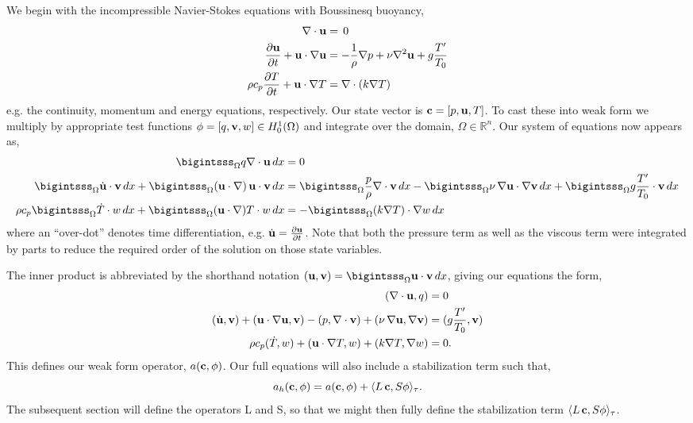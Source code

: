 We begin with the incompressible Navier-Stokes equations with Boussinesq
buoyancy,
\begin{align}
 \nabla \cdot {\bf u} &= \, 0 \label{eq_cont}\\
 \frac{\partial {\bf u}}{\partial t} + {\bf u} \cdot \nabla {\bf u} &= -\frac{1}{\rho}
 \nabla p + \nu \nabla^2 {\bf u} + g \frac{T'}{T_0} \label{eq_mom}\\
 \rho c_p \frac{\partial T}{\partial t} + {\bf u} \cdot \nabla T &= \nabla
 \cdot (k \nabla T) \label{eq_energy}
\end{align}
e.g. the continuity, momentum and energy equations, respectively. Our 
state vector is ${\bf c} =  \left[p,{\bf u},T \right]$. To cast these into
weak form we multiply by appropriate test 
functions ${\bf \phi} = \left[q,{\bf v},w \right] \in H^1_0(\Omega)$ and
integrate over the domain, $\Omega \in \mathbb{R}^n$. Our system of
equations now appears as, 
\begin{align}
  \bigintsss_\Omega q \nabla \cdot {\bf u} \, dx &= 0 \\
 \bigintsss_\Omega \dot {\bf u} \cdot {\bf v} \, dx +
 \bigintsss_\Omega  ({\bf u} \cdot \nabla) \, {\bf u} \cdot {\bf v} \, dx &=
 \bigintsss_\Omega \frac{p}{\rho} \nabla \cdot {\bf v} \, dx -
 \bigintsss_\Omega \nu \, \nabla {\bf u} \cdot \nabla {\bf v}
 \,dx + \bigintsss_\Omega g \frac{T'}{T_0} \cdot {\bf v} \, dx \\ 
 \rho c_p \bigintsss_\Omega \dot T \cdot w \, dx + \bigintsss_\Omega ({\bf u}
 \cdot \nabla) T \cdot w \, dx  &= -\bigintsss_\Omega (k \nabla T) \cdot
 \nabla w \, dx
\end{align}
%
where an ``over-dot'' denotes time differentiation, e.g. $\dot {\bf u} =
\frac{\partial {\bf u}}{\partial t}$. Note that both the pressure term as well
as the viscous term were integrated by parts to reduce the required
order of the solution on those state variables.  

The inner product is abbreviated by the shorthand notation $({\bf u},{\bf v}) =
\bigintsss_\Omega {\bf u}\cdot {\bf v}\, dx $, giving our equations the form,  
\begin{align}
 (\nabla \cdot {\bf u}, q) &= 0 \\
 (\dot {\bf u},{\bf v}) + ({\bf u} \cdot \nabla {\bf u}, {\bf v}) -
 (p,\nabla \cdot {\bf v}) + (\nu \, \nabla
 {\bf u}, \nabla {\bf v}) &= (g \frac{T'}{T_0},{\bf v}) \\
 \rho c_p (\dot T,w) + ({\bf u} \cdot \nabla T,w) + (k \nabla T,\nabla w) &= 0.
\end{align}
%
This defines our weak form operator, $ a({\bf c},{\bf \phi})$. Our full equations will
also include a stabilization term such that,  
\begin{equation}
 a_h({\bf c},{\bf \phi}) = a({\bf c},{\bf \phi}) +  \langle L\,{\bf c},S{\bf \phi} \rangle_\tau. 
\end{equation}
%
The subsequent section will define the operators L and S, so that we
might then fully define the stabilization term $\langle L\,{\bf c},S{\bf \phi}
\rangle_\tau$. 

